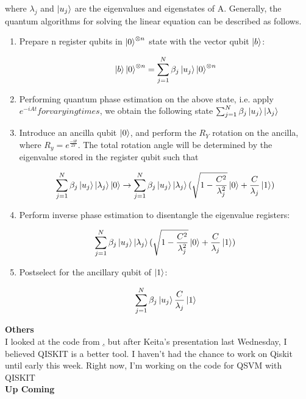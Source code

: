 \documentclass[11pt]{article}
\begin{document}
where $\lambda_{j}$ and $\ket{u_{j}}$ are the eigenvalues and eigenstates of A. Generally, the quantum algorithms for solving the linear equation can be described as follows.
\begin{enumerate}
\item Prepare n register qubits in $\ket{0}^{\otimes n}$ state with the vector qubit $\ket{b}$: 

$$\ket{b}\ket{0}^{\otimes n} = \sum_{j=1}^{N} \beta_{j} \ket{u_{j}} \ket{0}^{\otimes n}$$

\item Performing quantum phase estimation on the above state, i.e. apply $e^{-iAt} for varying times$, we obtain the following state $\sum_{j=1}^{N} \beta_{j} \ket{u_{j}}\ket{\lambda_{j}}$

\item Introduce an ancilla qubit $\ket{0}$, and perform the $R_{Y}$ rotation on the ancilla, where $R_{y} = e^{\frac{-i \theta}{2Y}}$. The total rotation angle will be determined by the eigenvalue stored in the register qubit such that

$$\sum_{j=1}^{N} \beta_{j} \ket{u_{j}} \ket{\lambda_{j}} \ket{0} \rightarrow \sum_{j=1}^{N} \beta_{j} \ket{u_{j}} \ket{\lambda_{j}} (\sqrt{1 - \frac{C^{2}}{\lambda_{j}^{2}}} \ket{0} + \frac{C}{\lambda_{j}} \ket{1})$$

\item Perform inverse phase estimation to disentangle the eigenvalue registers:

$$\sum_{j=1}^{N} \beta_{j} \ket{u_{j}} \ket{\lambda_{j}} (\sqrt{1 - \frac{C^{2}}{\lambda_{j}^{2}}} \ket{0} + \frac{C}{\lambda_{j}} \ket{1})$$

\item Postselect for the ancillary qubit of $\ket{1}$: 

$$\sum_{j=1}^{N} \beta_{j} \ket{u_{j}} \frac{C}{\lambda_{j}} \ket{1}$$

\end{enumerate}

\textbf{Others} \\

I looked at the code from \href{https://github.com/JinlongHuang/quantum-SVM}, but after Keita's presentation last Wednesday, I believed QISKIT is a better tool. I haven't had the chance to work on Qiskit until early this week. Right now, I'm working on the code for QSVM with QISKIT \\

\textbf{Up Coming} \\
\end{document}
